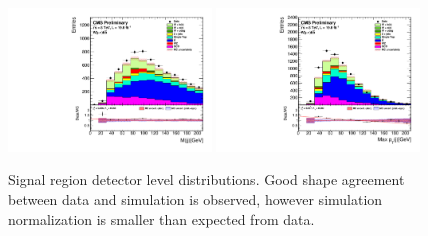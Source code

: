 \begin{figure}[htbp]
		\includegraphics[width=0.48\textwidth]{Figures/Results/Muon/prefit/Wbb_H_mass_doQCD1.pdf}
		\includegraphics[width=0.48\textwidth]{Figures/Results/Muon/prefit/Wbb_max_hJet_pt_doQCD1.pdf}		
	\caption[Signal region detector level distributions.]{Signal region detector level distributions. Good shape agreement between data and simulation is observed, however simulation normalization is smaller than expected from data.}
	\label{fig:Wbb_prefit_muon}
\end{figure}
